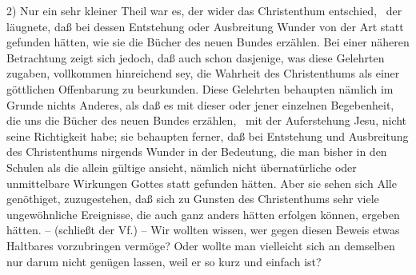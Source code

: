 {2) Nur ein sehr kleiner Theil war es, der wider das Christenthum entschied, \dh\  der läugnete, daß bei dessen Entstehung oder Ausbreitung Wunder von der Art statt gefunden hätten, wie sie die Bücher des neuen Bundes erzählen. Bei einer näheren Betrachtung zeigt sich jedoch, daß auch schon dasjenige, was diese Gelehrten zugaben, vollkommen hinreichend sey, die Wahrheit des Christenthums als einer göttlichen Offenbarung zu beurkunden. Diese Gelehrten behaupten nämlich im Grunde nichts Anderes, als daß es mit dieser oder jener einzelnen Begebenheit, die uns die Bücher des neuen Bundes erzählen, \zB\ mit der Auferstehung Jesu, nicht seine Richtigkeit habe; sie behaupten ferner, daß bei Entstehung und Ausbreitung des Christenthums nirgends Wunder in der Bedeutung, die man bisher in den Schulen als die allein gültige ansieht, nämlich nicht übernatürliche oder unmittelbare Wirkungen Gottes statt gefunden hätten. Aber sie sehen sich Alle genöthiget, zuzugestehen, daß sich zu Gunsten des Christenthums sehr viele ungewöhnliche Ereignisse, die auch ganz anders hätten erfolgen können, ergeben hätten.} --  (schließt der Vf.)  -- Wir wollten wissen, wer gegen diesen Beweis etwas Haltbares vorzubringen vermöge? Oder wollte man vielleicht sich an demselben nur darum nicht genügen lassen, weil er so kurz und einfach ist? \par

